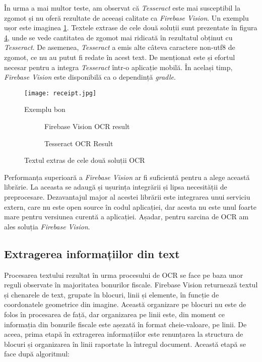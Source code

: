 În urma a mai multor teste, am observat că \emph{Tesseract} este mai susceptibil la zgomot și nu oferă rezultate de aceeași calitate ca \emph{Firebase Vision}. Un exemplu ușor este imaginea \ref{fig:exampleReceipt}. Textele extrase de cele două soluții sunt prezentate în figura \ref{fig:ocrResults}, unde se vede cantitatea de zgomot mai ridicată în rezultatul obținut cu \emph{Tesseract}. De asemenea, \emph{Tesseract} a emis alte câteva caractere non-utf8 de zgomot, ce nu au putut fi redate în acest text. De menționat este și efortul necesar pentru a integra \emph{Tesseract} într-o aplicație mobilă. În același timp, \emph{Firebase Vision} este disponibilă ca o dependință \emph{gradle}.

\begin{figure}[hb]
  \centering
  \texttt{[image: receipt.jpg]}
  \caption{Exemplu bon}
  \label{fig:exampleReceipt}
\end{figure}

\begin{figure}
  \begin{subfigure}{0.48\textwidth}
  
  \caption{Firebase Vision OCR result}
  \label{fig:firebaseResult}
  \end{subfigure}
  \hfill
  \begin{subfigure}{0.48\textwidth}
  
  \caption{Tesseract OCR Result}
  \label{fig:tesseractResult}
  \end{subfigure}
  \caption{Textul extras de cele două soluții OCR}
  \label{fig:ocrResults}
\end{figure}

Performanța superioară a \emph{Firebase Vision} ar fi suficientă pentru a alege această librărie. La aceasta se adaugă și ușurința integrării și lipsa necesității de preprocesare. Dezavantajul major al acestei librării este integrarea unui serviciu extern, care nu este open source în codul aplicației, dar acesta nu este unul foarte mare pentru versiunea curentă a aplicației. Așadar, pentru sarcina de OCR am ales soluția \emph{Firebase Vision}.

\subsection{Extragerea informațiilor din text}

Procesarea textului rezultat în urma procesului de OCR se face pe baza unor reguli observate în majoritatea bonurilor fiscale. Firebase Vision returnează textul și chenarele de text, grupate în blocuri, linii și elemente, în funcție de coordonatele geometrice din imagine. Această organizare pe blocuri nu este de folos în procesarea de față, dar organizarea pe linii este, din moment ce informația din bonurile fiscale este așezată în format cheie-valoare, pe linii. De aceea, prima etapă în extragerea informațiilor este renunțarea la structura de blocuri și organizarea în linii raportate la întregul document. Această etapă se face după algoritmul:

